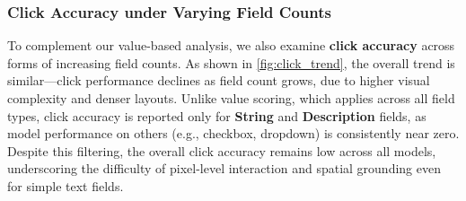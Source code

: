 \documentclass[sigconf, screen, review]{acmart}
\begin{document}
\subsubsection{Click Accuracy under Varying Field Counts}

To complement our value-based analysis, we also examine \textbf{click accuracy} across forms of increasing field counts. As shown in \cref{fig:click_trend}, the overall trend is similar—click performance declines as field count grows, due to higher visual complexity and denser layouts.
Unlike value scoring, which applies across all field types, click accuracy is reported only for \textbf{String} and \textbf{Description} fields, as model performance on others (e.g., checkbox, dropdown) is consistently near zero. Despite this filtering, the overall click accuracy remains low across all models, underscoring the difficulty of pixel-level interaction and spatial grounding even for simple text fields.
\end{document}
